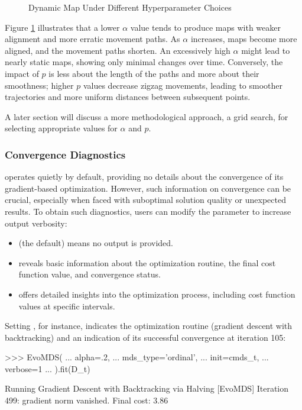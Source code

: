 \documentclass[article]{jss}
\begin{document}
\begin{figure}[hbt!]
  \centering
  \caption{\label{fig:hyperparameters} Dynamic Map Under Different Hyperparameter Choices}
\end{figure}
  
Figure \ref{fig:hyperparameters} illustrates that a lower $\alpha$ value tends to produce maps with weaker alignment 
and more erratic movement paths. As $\alpha$ increases, maps become more aligned, and the movement paths shorten. 
An excessively high $\alpha$ might lead to nearly static maps, showing only minimal changes over time. 
Conversely, the impact of $p$ is less about the length of the paths and more about their smoothness; higher $p$ values 
decrease zigzag movements, leading to smoother trajectories and more uniform distances between subsequent points.

A later section will discuss a more methodological approach, a grid search, for selecting appropriate 
values for $\alpha$ and $p$.

\subsubsection{Convergence Diagnostics}

 operates quietly by default, providing no details about the convergence
of its gradient-based optimization. However, such information on convergence can be crucial, 
especially when faced with suboptimal solution quality or unexpected results. 
To obtain such diagnostics, users can modify the  parameter to increase output verbosity: 
\begin{itemize}
  \item {} (the default) means no output is provided.
  \item {} reveals basic information about the optimization routine, the final cost function value, and %
  convergence status.
  \item {} offers detailed insights into the optimization process, including cost function values at %
  specific intervals.  
\end{itemize}

Setting , for instance, indicates the optimization routine (gradient descent with backtracking)
and an indication of its successful convergence at iteration 105:

\begin{CodeChunk}
\begin{CodeInput}
>>> EvoMDS(
...   alpha=.2,
...   mds_type='ordinal',
...   init=cmds_t,
...   verbose=1
... ).fit(D_t)    
\end{CodeInput}
\begin{CodeOutput}
[EvoMDS] Running Gradient Descent with Backtracking via Halving
[EvoMDS] Iteration 499: gradient norm vanished. Final cost: 3.86
\end{CodeOutput}
\end{CodeChunk}
\end{document}
